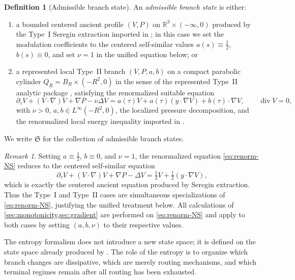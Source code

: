 \documentclass[11pt]{amsart}
\numberwithin{equation}{section}
\theoremstyle{plain}
\theoremstyle{definition}
\newtheorem{definition}[theorem]{Definition}
\theoremstyle{remark}
\newtheorem{remark}[theorem]{Remark}
\newcommand{\R}{\mathbb R}
\newcommand{\State}{\mathfrak S}
\newcommand{\diver}{\operatorname{div}}
\begin{document}
\begin{definition}[Admissible branch state]
\label{def:admissible-state}
An \emph{admissible branch state} is either:
\begin{enumerate}[label=\textup{(\roman*)},leftmargin=2.2em]
		\item a bounded centered ancient profile
		\((V,P)\) on \(\R^3\times(-\infty,0)\)
		produced by the Type~I Seregin extraction imported in
		; in this
		case we set the modulation coefficients to the centered self-similar
		values \(a(s)\equiv\tfrac12\), \(b(s)\equiv0\), and set
		\(\nu=1\) in the unified equation below; or
		\item a represented local Type~II branch \((V,P,a,b)\) on a compact
		parabolic cylinder \(Q_R=B_R\times(-R^2,0)\) in the sense of the
		represented Type~II analytic package ,
		satisfying the renormalized
	suitable equation
	\begin{equation}\label{eq:renorm-NS}
		\partial_\tau V+(V\cdot\nabla)V+\nabla P-\nu\Delta V
		= a(\tau)V+a(\tau)(y\cdot\nabla V)+b(\tau)\cdot\nabla V,
		\qquad \diver V=0,
	\end{equation}
		with \(\nu>0\), \(a,b\in L^\infty(-R^2,0)\), the localized pressure
		decomposition, and the renormalized local energy inequality imported in
		.
\end{enumerate}
We write \(\State\) for the collection of admissible branch states.
\end{definition}

\begin{remark}\label{rem:typeI-as-subcase}
Setting \(a\equiv\tfrac12\), \(b\equiv0\), and \(\nu=1\), the renormalized
equation \eqref{eq:renorm-NS} reduces to the centered self-similar equation
\[
	\partial_\tau V+(V\cdot\nabla)V+\nabla P-\Delta V
	= \tfrac12 V+\tfrac12(y\cdot\nabla V),
\]
which is exactly the centered ancient equation produced by Seregin
extraction.  Thus the Type~I and Type~II cases are simultaneous specializations of
\eqref{eq:renorm-NS}, justifying the unified treatment below.  All
calculations of \cref{sec:monotonicity,sec:gradient} are performed on
\eqref{eq:renorm-NS} and apply to both cases by setting \((a,b,\nu)\) to
their respective values.
\end{remark}

The entropy formalism does not introduce a new state space; it is defined on
the state space already produced by
.  The role
of the entropy is to organize which branch changes are dissipative, which
are merely routing mechanisms, and which terminal regimes remain after all
routing has been exhausted.
\end{document}
